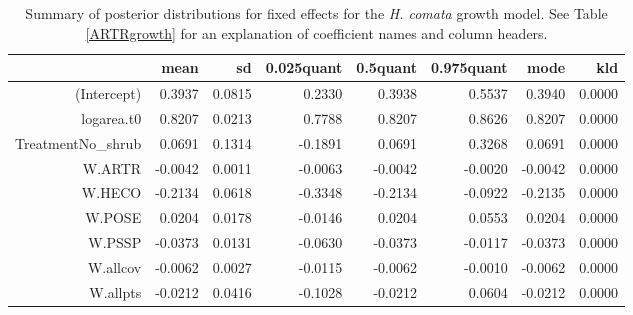\documentclass[11pt]{article}
\begin{document}
\begin{table}[ht]
\centering
\caption{Summary of posterior distributions for fixed effects for the \textit{H. comata} growth model. See Table \ref{ARTRgrowth} for an explanation of coefficient names
and column headers.} 
\label{HECOgrowth}
\begin{tabular}{rrrrrrrr}
  \hline
 & mean & sd & 0.025quant & 0.5quant & 0.975quant & mode & kld \\ 
  \hline
(Intercept) & 0.3937 & 0.0815 & 0.2330 & 0.3938 & 0.5537 & 0.3940 & 0.0000 \\ 
  logarea.t0 & 0.8207 & 0.0213 & 0.7788 & 0.8207 & 0.8626 & 0.8207 & 0.0000 \\ 
  TreatmentNo\_shrub & 0.0691 & 0.1314 & -0.1891 & 0.0691 & 0.3268 & 0.0691 & 0.0000 \\ 
  W.ARTR & -0.0042 & 0.0011 & -0.0063 & -0.0042 & -0.0020 & -0.0042 & 0.0000 \\ 
  W.HECO & -0.2134 & 0.0618 & -0.3348 & -0.2134 & -0.0922 & -0.2135 & 0.0000 \\ 
  W.POSE & 0.0204 & 0.0178 & -0.0146 & 0.0204 & 0.0553 & 0.0204 & 0.0000 \\ 
  W.PSSP & -0.0373 & 0.0131 & -0.0630 & -0.0373 & -0.0117 & -0.0373 & 0.0000 \\ 
  W.allcov & -0.0062 & 0.0027 & -0.0115 & -0.0062 & -0.0010 & -0.0062 & 0.0000 \\ 
  W.allpts & -0.0212 & 0.0416 & -0.1028 & -0.0212 & 0.0604 & -0.0212 & 0.0000 \\ 
   \hline
\end{tabular}
\end{table}
\end{document}
